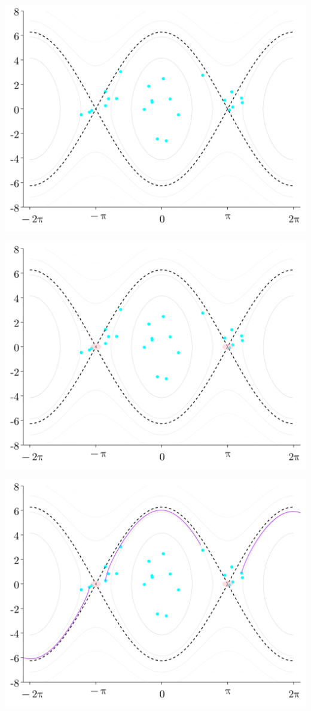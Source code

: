 \documentclass[
]{report}
\begin{document}
\includegraphics{contents/assets/neuralpbc/016.svg}

\includegraphics{contents/assets/neuralpbc/017.svg}

\includegraphics{contents/assets/neuralpbc/018.svg}
\end{document}
